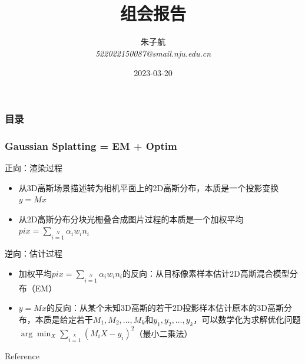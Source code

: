 \documentclass{njupre/njupre}
\title[组会报告]{ 组会报告 }
\author[朱子航]{\texorpdfstring{朱子航 \\ \smallskip \textit{522022150087@smail.nju.edu.cn}}{}}
\date[\today]{\texorpdfstring{2023-03-20}{}}
\begin{document}
\begin{frame}
    \titlepage
\end{frame}
\begin{frame}
    \frametitle{目录}
    \tableofcontents
\end{frame}

\begin{frame}
    \frametitle{Gaussian Splatting = EM + Optim}
    正向：渲染过程
    \begin{itemize}
        \item 从3D高斯场景描述转为相机平面上的2D高斯分布，本质是一个投影变换$y=Mx$
        \item 从2D高斯分布分块光栅叠合成图片过程的本质是一个加权平均$pix=\sum\limits_{i=1}\limits^{N} \alpha_i w_in_i$
    \end{itemize}  
    逆向：估计过程
    \begin{itemize}
        \item 加权平均$pix=\sum\limits_{i=1}\limits^{N} \alpha_i w_in_i$的反向：从目标像素样本估计2D高斯混合模型分布（EM）
        \item $y=Mx$的反向：从某个未知3D高斯的若干2D投影样本估计原本的3D高斯分布，本质是给定若干$M_1,M_2,\dots,M_k$和$y_1,y_2,\dots,y_k$，可以数学化为求解优化问题$\arg\min_X \sum\limits_{i=1}\limits^{k} (M_iX-y_i)^2$（最小二乘法）
    \end{itemize}   
\end{frame}


\begin{frame}[allowframebreaks]{Reference}
    
    
\end{frame}
\end{document}
